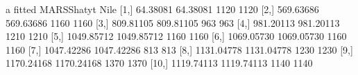 \begin{Schunk}
\begin{Soutput}
               a     fitted MARSShatyt Nile
 [1,]   64.38081   64.38081       1120 1120
 [2,]  569.63686  569.63686       1160 1160
 [3,]  809.81105  809.81105        963  963
 [4,]  981.20113  981.20113       1210 1210
 [5,] 1049.85712 1049.85712       1160 1160
 [6,] 1069.05730 1069.05730       1160 1160
 [7,] 1047.42286 1047.42286        813  813
 [8,] 1131.04778 1131.04778       1230 1230
 [9,] 1170.24168 1170.24168       1370 1370
[10,] 1119.74113 1119.74113       1140 1140
\end{Soutput}
\end{Schunk}
